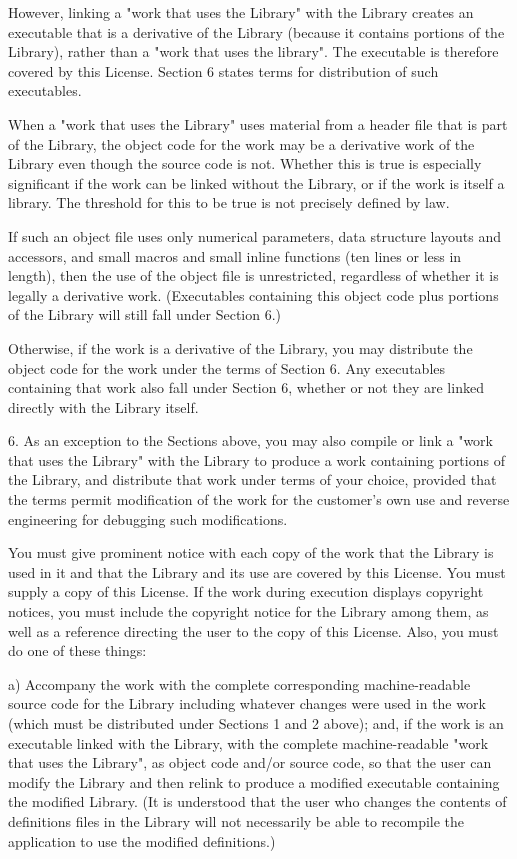 \documentclass[twoside]{tceusermanual}
\begin{document}
However, linking a "work that uses the Library" with the Library
creates an executable that is a derivative of the Library
(because it contains portions of the Library), rather than a
"work that uses the library".  The executable is therefore
covered by this License. Section 6 states terms for distribution
of such executables.

When a "work that uses the Library" uses material from a header
file that is part of the Library, the object code for the work
may be a derivative work of the Library even though the source
code is not. Whether this is true is especially significant if
the work can be linked without the Library, or if the work is
itself a library.  The threshold for this to be true is not
precisely defined by law.

If such an object file uses only numerical parameters, data
structure layouts and accessors, and small macros and small
inline functions (ten lines or less in length), then the use of
the object file is unrestricted, regardless of whether it is
legally a derivative work.  (Executables containing this object
code plus portions of the Library will still fall under Section
6.)

Otherwise, if the work is a derivative of the Library, you may
distribute the object code for the work under the terms of
Section 6. Any executables containing that work also fall under
Section 6, whether or not they are linked directly with the
Library itself.
 
6. As an exception to the Sections above, you may also compile
or link a "work that uses the Library" with the Library to
produce a work containing portions of the Library, and
distribute that work under terms of your choice, provided that
the terms permit modification of the work for the customer's own
use and reverse engineering for debugging such modifications.

You must give prominent notice with each copy of the work that
the Library is used in it and that the Library and its use are
covered by this License.  You must supply a copy of this
License.  If the work during execution displays copyright
notices, you must include the copyright notice for the Library
among them, as well as a reference directing the user to the
copy of this License.  Also, you must do one of these things:

    a) Accompany the work with the complete corresponding
    machine-readable source code for the Library including whatever
    changes were used in the work (which must be distributed under
    Sections 1 and 2 above); and, if the work is an executable linked
    with the Library, with the complete machine-readable "work that
    uses the Library", as object code and/or source code, so that the
    user can modify the Library and then relink to produce a modified
    executable containing the modified Library.  (It is understood
    that the user who changes the contents of definitions files in the
    Library will not necessarily be able to recompile the application
    to use the modified definitions.)
\end{document}
